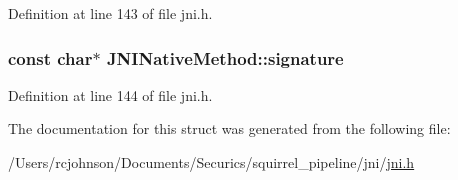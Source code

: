Definition at line 143 of file jni.\-h.

\hypertarget{struct_j_n_i_native_method_ad6d2e4d24ce0971f17259960d9f1d536}{
\subsubsection[{signature}]{\setlength{\rightskip}{0pt plus 5cm}const char$\ast$ J\-N\-I\-Native\-Method\-::signature}}\label{struct_j_n_i_native_method_ad6d2e4d24ce0971f17259960d9f1d536}


Definition at line 144 of file jni.\-h.



The documentation for this struct was generated from the following file\-:\begin{DoxyCompactItemize}
\item 
/\-Users/rcjohnson/\-Documents/\-Securics/squirrel\-\_\-pipeline/jni/\hyperlink{jni_8h}{jni.\-h}\end{DoxyCompactItemize}
